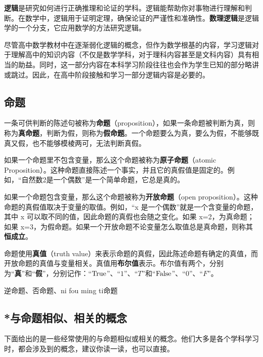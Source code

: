 
\begin{issues}
\issueDraft
\end{issues}

\textbf{逻辑}是研究如何进行正确推理和论证的学科。逻辑能帮助你对事物进行理解和判断。在数学中，逻辑用于证明定理，确保论证的严谨性和准确性。\textbf{数理逻辑}是逻辑学的一个分支，它应用数学的方法研究逻辑。

尽管高中数学教材中在逐渐弱化逻辑的概念，但作为数学根基的内容，学习逻辑对于理解高中的知识内容（不仅是数学学科，对于理科内容甚至是文科内容）具有相当的助益。同时，这一部分内容在本科学习阶段往往也会作为学生已知的部分略讲或跳过。因此，在高中阶段接触和学习一部分逻辑内容是必要的。

\subsection{命题}

一条可供判断的陈述句被称为\textbf{命题}（proposition），如果一条命题被判断为真，则称为\textbf{真命题}，判断为假，则称为\textbf{假命题}。一个命题要么为真，要么为假，不能够既真又假，也不能够模棱两可，无法判断真假。

如果一个命题里不包含变量，那么这个命题被称为\textbf{原子命题}（atomic Proposition）。这种命题直接陈述一个事实，并且它的真假值是固定的。例如，“自然数2是一个偶数”是一个简单命题，它总是真的。

如果一个命题包含变量，那么这个命题被称为\textbf{开放命题}（open proposition）。这种命题的真假值取决于变量的取值。例如，“x 是一个偶数”就是一个含变量的命题，其中 x 可以取不同的值，因此命题的真假也会随之变化。如果 x=2，为真命题；如果 x=3，为假命题。如果一个开放命题不论变量怎么取值总是真命题，则称其\textbf{恒成立}。

命题使用\textbf{真值}（truth value）来表示命题的真假，因此陈述命题有确定的真值，而开放命题的真值与变量相关。真值用\textbf{布尔值}表示。布尔值有两个，分别为“\textbf{真}”和“\textbf{假}”，分别记作：“${\rm True}$”、“$1$”、“$T$”和“${\rm False}$”、“$0$”、“$F$”。

逆命题、否命题、ni fou ming ti命题

\subsection{*与命题相似、相关的概念}
下面给出的是一些经常使用的与命题相似或相关的概念。他们大多是各个学科学习时，都会涉及到的概念，建议你读一读，也可以直接。

